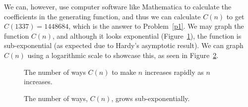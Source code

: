 We can, however, use computer software like Mathematica to calculate the coefficients in the generating function, and thus we can calculate $C(n)$ to get $C(1337) = 1448684$, which is the answer to Problem~\ref{p1}. We may graph the function $C(n)$, and although it looks exponential (Figure~\ref{f1}), the function is sub-exponential (as expected due to Hardy's asymptotic result). We can graph $C(n)$ using a logarithmic scale to showcase this, as seen in Figure~\ref{f2:log}.
\begin{figure}[htbp!]
  \centering
  \caption{The number of ways $C(n)$ to make $n$ increases rapidly as $n$ increases.}
  \label{f1}
\end{figure}
\begin{figure}[htbp!]
  \centering
  \caption{The number of ways, $C(n)$, grows sub-exponentially.}
  \label{f2:log}
\end{figure}
